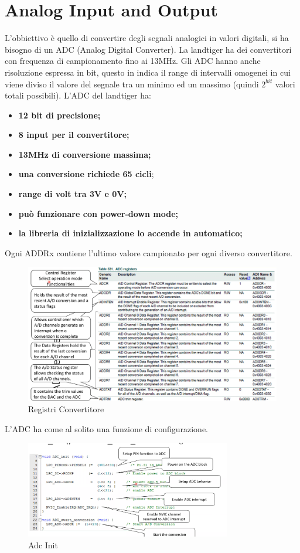 \documentclass[12pt]{article}
\begin{document}
\newpage
\section{Analog Input and Output}
L'obbiettivo \`e quello di convertire degli segnali analogici in valori digitali, si ha bisogno di un ADC (Analog Digital Converter). La landtiger ha dei convertitori con frequenza di campionamento fino ai 13MHz. Gli ADC hanno anche risoluzione espressa in bit, questo in indica il range di intervalli omogenei in cui viene diviso il valore del segnale tra un minimo ed un massimo (quindi $2^{bit}$ valori totali possibili). L'ADC del landtiger ha:
\begin{itemize}
    \item \textbf{12 bit di precisione;}
    \item \textbf{8 input per il convertitore;}
    \item \textbf{13MHz di conversione massima;}
    \item \textbf{una conversione richiede 65 cicli};
    \item \textbf{range di volt tra 3V e 0V;}
    \item \textbf{pu\`o funzionare con power-down mode;}
    \item \textbf{la libreria di inizializzazione lo accende in automatico;}
\end{itemize}
Ogni ADDRx contiene l'ultimo valore campionato per ogni diverso convertitore.
\begin{figure}[H]
    \centering
    \includegraphics[width=1\textwidth]{registri-convertitore.png}
    \caption{Registri Convertitore}
    \label{fig:registri-convertitore}
\end{figure}
L'ADC ha come al solito una funzione di configurazione.
\begin{figure}[H]
    \centering
    \includegraphics[width=0.8\textwidth]{adc-init.png}
    \caption{Adc Init}
    \label{fig:adc-init}
\end{figure}
\end{document}
